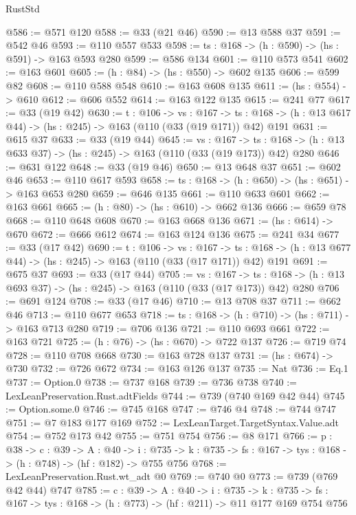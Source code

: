 \begin{lexlean}{RustStd}
\begin{coremodule}
@586 := @571 @120
@588 := @33 (@21 @46)
@590 := @13 @588 @37
@591 := @542 @46
@593 := @110 @557 @533
@598 := {ts : @168} -> (h : @590) -> (hs : @591) -> @163 @593 @280
@599 := @586 @134
@601 := @110 @573 @541
@602 := @163 @601
@605 := (h : @84) -> (hs : @550) -> @602 @135
@606 := @599 @82
@608 := @110 @588 @548
@610 := @163 @608 @135
@611 := (hs : @554) -> @610
@612 := @606 @552
@614 := @163 @122 @135
@615 := @241 @77
@617 := @33 (@19 @42)
@630 := {t : @106} ->
  {vs : @167} ->
  {ts : @168} -> (h : @13 @617 @44) -> (hs : @245) -> @163 (@110 (@33 (@19 @171)) @42) @191
@631 := @615 @37
@633 := @33 (@19 @44)
@645 := {vs : @167} ->
  {ts : @168} -> (h : @13 @633 @37) -> (hs : @245) -> @163 (@110 (@33 (@19 @173)) @42) @280
@646 := @631 @122
@648 := @33 (@19 @46)
@650 := @13 @648 @37
@651 := @602 @46
@653 := @110 @617 @593
@658 := {ts : @168} -> (h : @650) -> (hs : @651) -> @163 @653 @280
@659 := @646 @135
@661 := @110 @633 @601
@662 := @163 @661
@665 := (h : @80) -> (hs : @610) -> @662 @136
@666 := @659 @78
@668 := @110 @648 @608
@670 := @163 @668 @136
@671 := (hs : @614) -> @670
@672 := @666 @612
@674 := @163 @124 @136
@675 := @241 @34
@677 := @33 (@17 @42)
@690 := {t : @106} ->
  {vs : @167} ->
  {ts : @168} -> (h : @13 @677 @44) -> (hs : @245) -> @163 (@110 (@33 (@17 @171)) @42) @191
@691 := @675 @37
@693 := @33 (@17 @44)
@705 := {vs : @167} ->
  {ts : @168} -> (h : @13 @693 @37) -> (hs : @245) -> @163 (@110 (@33 (@17 @173)) @42) @280
@706 := @691 @124
@708 := @33 (@17 @46)
@710 := @13 @708 @37
@711 := @662 @46
@713 := @110 @677 @653
@718 := {ts : @168} -> (h : @710) -> (hs : @711) -> @163 @713 @280
@719 := @706 @136
@721 := @110 @693 @661
@722 := @163 @721
@725 := (h : @76) -> (hs : @670) -> @722 @137
@726 := @719 @74
@728 := @110 @708 @668
@730 := @163 @728 @137
@731 := (hs : @674) -> @730
@732 := @726 @672
@734 := @163 @126 @137
@735 := Nat
@736 := Eq.{1}
@737 := Option.{0}
@738 := @737 @168
@739 := @736 @738
@740 := LexLeanPreservation.Rust.adtFields
@744 := @739 (@740 @169 @42 @44)
@745 := Option.some.{0}
@746 := @745 @168
@747 := @746 @4
@748 := @744 @747
@751 := @7 @183 @177 @169
@752 := LexLeanTarget.TargetSyntax.Value.adt
@754 := @752 @173 @42
@755 := @751 @754
@756 := @8 @171
@766 := {p : @38} ->
  {c : @39} ->
  {A : @40} ->
  {i : @735} -> {k : @735} -> {fs : @167} -> {tys : @168} -> (h : @748) -> (hf : @182) -> @755 @756
@768 := LexLeanPreservation.Rust.wt_adt @0
@769 := @740 @0
@773 := @739 (@769 @42 @44) @747
@785 := {c : @39} ->
  {A : @40} ->
  {i : @735} ->
  {k : @735} -> {fs : @167} -> {tys : @168} -> (h : @773) -> (hf : @211) -> @11 @177 @169 @754 @756

\end{coremodule}
\end{lexlean}
